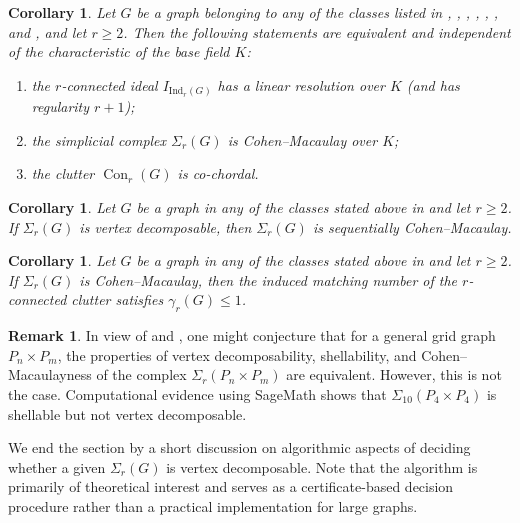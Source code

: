\documentclass[12pt,reqno]{amsart}
\newtheorem{corollary}[proposition]{Corollary}
\theoremstyle{definition}
\newtheorem{remark}[proposition]{Remark}
\begin{document}
\begin{corollary}\label{cor:field-independent}
Let $G$ be a graph belonging to any of the classes listed in
, , , , , , and , and let $r \ge 2$.
Then the following statements are equivalent and independent of the
characteristic of the base field $K$:
\begin{enumerate}
  \item the $r$-connected ideal $I_{\mathrm{Ind}_r(G)}$ has a linear resolution over $K$ (and has regularity $r+1$);
  \item the simplicial complex $\Sigma_r(G)$ is Cohen--Macaulay over $K$;
  \item the clutter $\operatorname{Con}_r(G)$ is co-chordal.
\end{enumerate}
\end{corollary}

\begin{corollary}\label{cor:seq-cm}
Let $G$ be a graph in any of the classes stated above in  and let $r \ge 2$.
If $\Sigma_r(G)$ is vertex decomposable, then $\Sigma_r(G)$ is
sequentially Cohen--Macaulay.
\end{corollary}

\begin{corollary}\label{cor:gamma-bound}
Let $G$ be a graph in any of the classes stated above in  and let $r \ge 2$.
If $\Sigma_r(G)$ is Cohen--Macaulay, then the induced matching number of
the $r$-connected clutter satisfies $\gamma_r(G) \le 1$.
\end{corollary}

\begin{remark}\label{general grid counter}
In view of  and , one might conjecture that for a general grid graph $P_n \times P_m$, the properties of vertex decomposability, shellability, and Cohen–Macaulayness of the complex $\Sigma_r(P_n \times P_m)$ are equivalent. 
However, this is not the case. Computational evidence using SageMath shows that $\Sigma_{10}(P_4 \times P_4)$ is shellable but not vertex decomposable.   
\end{remark}

We end the section by a short discussion on algorithmic aspects of deciding whether a given $\Sigma_r(G)$ is vertex decomposable. 
Note that the algorithm is primarily of theoretical interest and serves as a certificate-based decision procedure rather than a practical implementation for large graphs. 
\end{document}

